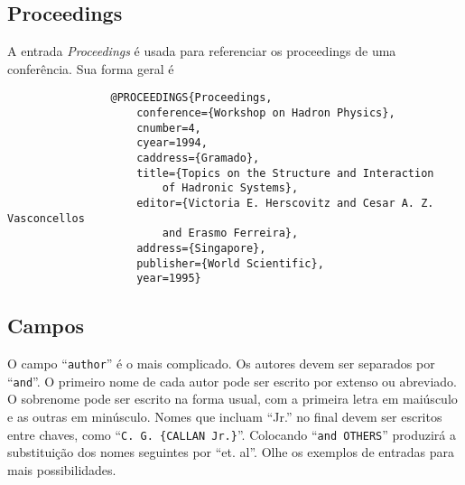 \documentclass[a4paper,12pt]{article}
\newcommand{\ca}{\c{c}\~ao}
\newcommand{\enf}{\em}
\begin{document}
			
			
			
			\subsection*{Proceedings}
			
			A entrada {\enf Proceedings} \'e usada para referenciar os proceedings de uma 
			confer\^encia.
			Sua forma geral \'e \cite{Proceedings}
			\begin{verbatim}
				@PROCEEDINGS{Proceedings,
					conference={Workshop on Hadron Physics},
					cnumber=4,
					cyear=1994,
					caddress={Gramado},
					title={Topics on the Structure and Interaction
						of Hadronic Systems},
					editor={Victoria E. Herscovitz and Cesar A. Z. Vasconcellos
						and Erasmo Ferreira},
					address={Singapore},
					publisher={World Scientific},
					year=1995}
			\end{verbatim}
			
			
			
			
			\begin{comment}
				\subsection*{Techreport}
				
				A entrada {\enf Techreport} \'e usada para referenciar um artigo
				publicado por uma institui{\ca}.
				Sua forma geral \'e \cite{Techreport}
				\begin{verbatim}
				\end{verbatim}
				
				
				
				\subsection*{Unpublished}
				
				A entrada {\enf Unpublished} \'e usada para referenciar um artigo
				ainda n\~ao publicado.
				Sua forma geral \'e \cite{Unpublished}
				\begin{verbatim}
				\end{verbatim}
			\end{comment}
			
			
			
			\subsection{Campos}
			
			
			O campo ``\verb+author+'' \'e
			o mais complicado. Os autores devem ser separados por
			``\verb+and+''. O primeiro nome de cada autor pode ser escrito por extenso
			ou abreviado. O sobrenome pode ser escrito na forma usual, com
			a primeira letra em mai\'usculo e as outras em min\'usculo.
			Nomes que incluam ``Jr.'' no final devem ser escritos entre chaves, como
			``\verb+C. G. {CALLAN Jr.}+''. 
			Colocando ``\verb+and OTHERS+'' produzir\'a
			a substitui{\ca} dos nomes seguintes por ``et. al''.
			Olhe os exemplos de entradas para mais possibilidades.
			
\end{document}
